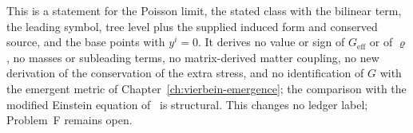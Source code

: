 This is a statement for the Poisson limit, the stated class with the bilinear term, the leading symbol, tree level plus the supplied induced form and conserved source, and the base points with \(y^i=0\). It derives no value or sign of \(G_{\mathrm{eff}}\) or of \(\varrho\), no masses or subleading terms, no matrix-derived matter coupling, no new derivation of the conservation of the extra stress, and no identification of \(G\) with the emergent metric of Chapter~\ref{ch:vierbein-emergence}; the comparison with the modified Einstein equation of~\cite{KumarSteinacker2023,Steinacker2026} is structural. This changes no ledger label; Problem~F remains open.

